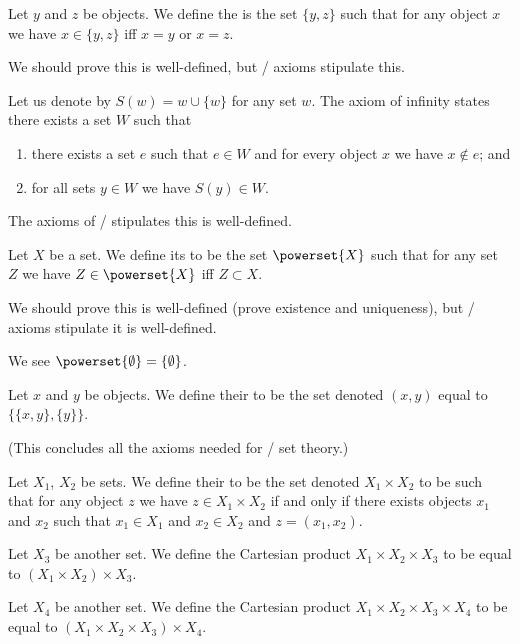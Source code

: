 \begin{axiom}
Let $y$ and $z$ be objects. We define the  is
the set $\{y,z\}$ such that for any object $x$ we have $x\in\{y,z\}$
iff $x=y$ or $x=z$.

We should prove this is well-defined, but \ZF/ axioms stipulate this.
\end{axiom}

\begin{axiom}[Infinity]
Let us denote by $S(w)=w\cup\{w\}$ for any set $w$.
The axiom of infinity states there exists a set $W$ such that 
\begin{enumerate}
\item there exists a set $e$ such that $e\in W$ and for every object
  $x$ we have $x\notin e$; and
\item for all sets $y\in W$ we have $S(y)\in W$.
\end{enumerate}
The axioms of \ZF/ stipulates this is well-defined.
\end{axiom}

\begin{axiom}[Powerset]
Let $X$ be a set. We define its  to be the set
$\powerset{X}$ such that for any set $Z$ we have $Z\in\powerset{X}$
iff $Z\subset X$.

We should prove this is well-defined (prove existence and uniqueness),
but \ZF/ axioms stipulate it is well-defined.
\end{axiom}

\begin{theorem}
We see $\powerset{\emptyset}=\{\emptyset\}$.
\end{theorem}

\begin{definition}
Let $x$ and $y$ be objects. We define their  to
be the set denoted $(x,y)$ equal to $\{\{x,y\},\{y\}\}$.
\end{definition}

(This concludes all the axioms needed for \ZF/ set theory.)

\begin{definition}
Let $X_{1}$, $X_{2}$ be sets. 
We define their  to be the set denoted
$X_{1}\times X_{2}$ to be such that
for any object $z$ we have $z\in X_{1}\times X_{2}$ if and only if
there exists objects $x_{1}$ and $x_{2}$ such that $x_{1}\in X_{1}$
and $x_{2}\in X_{2}$ and $z=(x_{1},x_{2})$.

Let $X_{3}$ be another set. We define the Cartesian product
$X_{1}\times X_{2}\times X_{3}$ to be equal to $(X_{1}\times X_{2})\times X_{3}$.

Let $X_{4}$ be another set. We define the Cartesian product
$X_{1}\times X_{2}\times X_{3}\times X_{4}$ to be equal to
$(X_{1}\times X_{2}\times X_{3})\times X_{4}$.
\end{definition}


